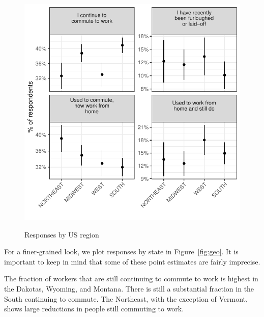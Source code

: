 \documentclass[12pt]{article}
\begin{document}
\begin{figure}
  \caption{Responses by US region} \label{fig:region}
\centering
\begin{minipage}{1.0 \linewidth}
  \includegraphics[width = \linewidth]{plots/region.pdf} \\
  \begin{footnotesize}
    \end{footnotesize}
\end{minipage}
\end{figure} 

For a finer-grained look, we plot responses by state in Figure~\ref{fig:geo}.
It is important to keep in mind that some of these point estimates are fairly imprecise.

The fraction of workers that are still continuing to commute to work is highest in the Dakotas, Wyoming, and Montana.
There is still a substantial fraction in the South continuing to commute. 
The Northeast, with the exception of Vermont, shows large reductions in people still commuting to work. 
\end{document}

